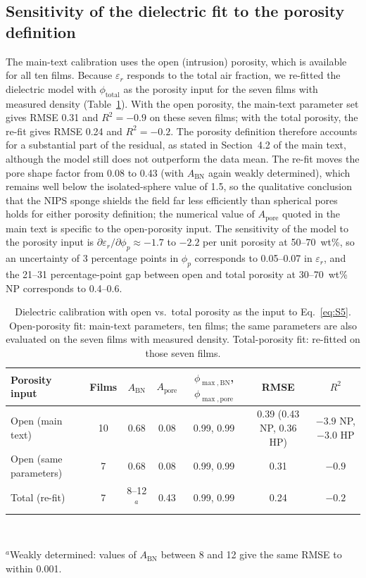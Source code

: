 \documentclass[10pt,a4paper]{article}
\newcommand{\eps}{\ensuremath{\varepsilon_r}}
\newcommand{\Apore}{\ensuremath{A_{\mathrm{pore}}}}
\newcommand{\ABN}{\ensuremath{A_{\mathrm{BN}}}}
\begin{document}
\subsection{Sensitivity of the dielectric fit to the porosity definition}
\label{si:porosityfit}
The main-text calibration uses the open (intrusion) porosity, which is available for all ten films. Because \eps{} responds to the total air fraction, we re-fitted the dielectric model with $\phi_{\mathrm{total}}$ as the porosity input for the seven films with measured density (Table~\ref{tab:S3}). With the open porosity, the main-text parameter set gives RMSE 0.31 and $R^2 = -0.9$ on these seven films; with the total porosity, the re-fit gives RMSE 0.24 and $R^2 = -0.2$. The porosity definition therefore accounts for a substantial part of the residual, as stated in Section~4.2 of the main text, although the model still does not outperform the data mean. The re-fit moves the pore shape factor from 0.08 to 0.43 (with \ABN{} again weakly determined), which remains well below the isolated-sphere value of 1.5, so the qualitative conclusion that the NIPS sponge shields the field far less efficiently than spherical pores holds for either porosity definition; the numerical value of \Apore{} quoted in the main text is specific to the open-porosity input. The sensitivity of the model to the porosity input is $\partial\eps/\partial\phi_p \approx -1.7$ to $-2.2$ per unit porosity at 50--70~wt\%, so an uncertainty of 3 percentage points in $\phi_p$ corresponds to 0.05--0.07 in \eps, and the 21--31 percentage-point gap between open and total porosity at 30--70~wt\% NP corresponds to 0.4--0.6.

\begin{table}[htbp]
\centering
\caption{Dielectric calibration with open vs.\ total porosity as the input to Eq.~\ref{eq:S5}. Open-porosity fit: main-text parameters, ten films; the same parameters are also evaluated on the seven films with measured density. Total-porosity fit: re-fitted on those seven films.}
\label{tab:S3}
\footnotesize
\begin{tabular}{@{}lcccccc@{}}
\toprule
Porosity input & Films & \ABN & \Apore & $\phi_{\max,\mathrm{BN}}$, $\phi_{\max,\mathrm{pore}}$ & RMSE & $R^2$ \\
\midrule
Open (main text)          & 10 & 0.68 & 0.08 & 0.99, 0.99 & 0.39 (0.43 NP, 0.36 HP) & $-3.9$ NP, $-3.0$ HP \\
Open (same parameters)    & 7  & 0.68 & 0.08 & 0.99, 0.99 & 0.31 & $-0.9$ \\
Total (re-fit)            & 7  & 8--12$^{a}$ & 0.43 & 0.99, 0.99 & 0.24 & $-0.2$ \\
\bottomrule
\end{tabular}\\[3pt]
\parbox{0.9\linewidth}{\footnotesize $^{a}$Weakly determined: values of \ABN{} between 8 and 12 give the same RMSE to within 0.001.}
\end{table}
\end{document}
